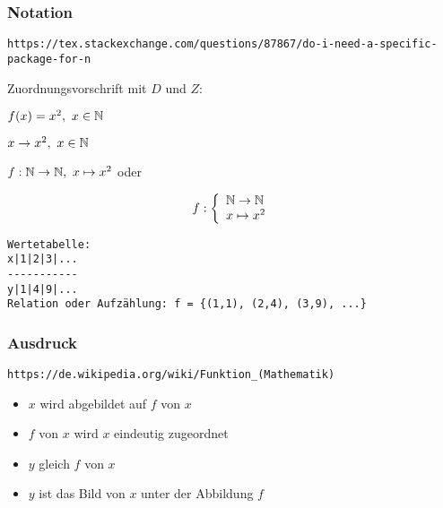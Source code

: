 \documentclass[10pt,a4paper]{article}
\begin{document}
    
\subsubsection {Notation}

\verb+https://tex.stackexchange.com/questions/87867/do-i-need-a-specific-package-for-n+
\vskip 8pt
\begin{labeling}{Zuordnungsvorschrift mit $D$ und $Z$:} 
  \setlength\itemsep{-3pt}
  \item[Funktionsgleichung:]   $f(x) = x^2,\ x \in \mathbb{N}$
  \item[Zuordnungsvorschrift mit $D$:] $x \rightarrow x^2,\ x \in \mathbb{N}$
    
  \setlength\itemsep{-12pt}
  \item[Zuordnungsvorschrift mit $D$ und $Z$:]
    $f: \mathbb{N} \rightarrow \mathbb{N},\ x \mapsto x^2$ oder
    \hskip -16pt
    \begin{minipage}{0.3\textwidth}
    \[ f: \left\{%
    \begin{array}{ll}
      \N \rightarrow \N \\
      x \mapsto x^2 
    \end{array}
    \right.
    \]
    \end{minipage}
    
\end{labeling}
\vskip 8pt

\begin{verbatim}
Wertetabelle:
x|1|2|3|...
-----------
y|1|4|9|...
Relation oder Aufzählung: f = {(1,1), (2,4), (3,9), ...}
\end{verbatim}
\vskip 8pt


\subsubsection {Ausdruck}

\verb+https://de.wikipedia.org/wiki/Funktion_(Mathematik)+
\vskip 15pt
\hskip -15pt
\begin{minipage}{0.9\textwidth}
  \begin{itemize}
    \setlength\itemsep{0em}

    \item $x$ wird abgebildet auf $f$ von $x$
    \item $f$ von $x$ wird $x$ eindeutig zugeordnet
    \item $y$ gleich $f$ von $x$
    \item $y$ ist das Bild von $x$ unter der Abbildung $f$
      
  \end{itemize}
\end{minipage}
\end{document}
